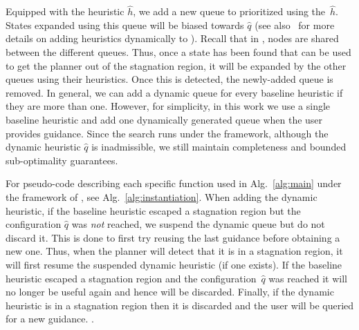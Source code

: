 \documentclass{article}
\begin{document}
Equipped with the heuristic $\hat{h}$, we add a new queue to \mhastar prioritized using the~$\hat{h}$. %
States expanded using this queue will be biased towards $\hat{q}$ (see also~\cite{INL15} for more details on adding heuristics dynamically to \mhastar
).
Recall that in \mhastar, nodes are shared between the different queues.
Thus, once a state has been found that can be used to get the planner out of the stagnation region, it will be expanded by the other queues using their heuristics.
Once this is detected, 
the newly-added queue is removed.
In general,  we can add a dynamic queue for every baseline heuristic if they are more than one. However, for simplicity, in this work we use a single baseline heuristic and add one dynamically generated queue when the user provides guidance. Since the search runs under the \mhastar framework, although the dynamic heuristic $\hat{q}$ is inadmissible, we still maintain completeness and bounded sub-optimality guarantees.

For pseudo-code describing each specific function used  in Alg.~\ref{alg:main} under the framework of \mhastar, see Alg.~\ref{alg:instantiation}.
When adding the dynamic heuristic, if the baseline heuristic escaped a stagnation region but the configuration $\hat{q}$ was \emph{not} reached, we suspend the dynamic queue but do not discard it. 
This is done to first try reusing the last guidance before obtaining a new one. 
Thus, when the planner will detect that it is in a stagnation region, it will first resume the suspended dynamic heuristic (if one exists).
%
If the baseline heuristic escaped a stagnation region and the configuration~$\hat{q}$ was  reached it will no longer be useful again and hence will be discarded.
Finally, if the dynamic heuristic is in a stagnation region then it is discarded and the user will be queried for a new guidance. 
.
\end{document}
